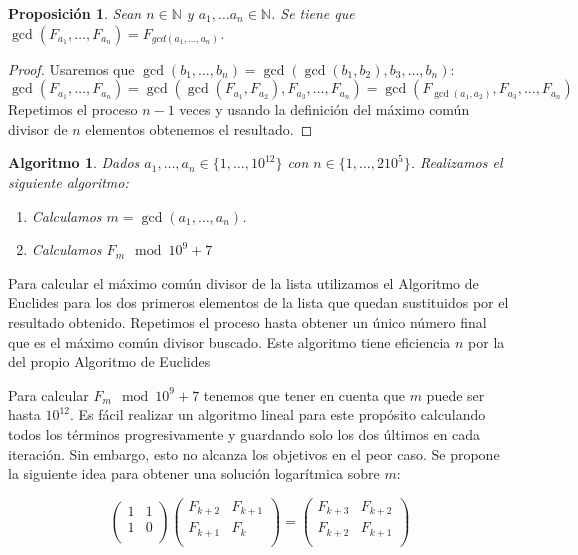 \documentclass{article}
\theoremstyle{theorem-style}  %
\newtheorem{proposition}{Proposición}
\newtheorem{algorithm}{Algoritmo}
\theoremstyle{definition}
\theoremstyle{example-style}
\begin{document}
    \begin{proposition}
        Sean $n \in \mathbb{N}$ y $a_1, \dots a_n \in \mathbb{N}$. Se tiene que 
        $\gcd(F_{a_1}, \dots, F_{a_n}) = F_{gcd(a_1, \dots, a_n)}$. 
    \end{proposition}
    \begin{proof}
        Usaremos que $\gcd(b_1, \dots, b_n) = \gcd( \gcd(b_1, b_2), b_3, \dots, b_n)$:
        $$ \gcd(F_{a_1}, \dots, F_{a_n}) = \gcd(\gcd(F_{a_1},F_{a_2}), F_{a_3}, \dots, F_{a_n}) = \gcd(F_{\gcd(a_1, a_2)}, F_{a_3}, \dots, F_{a_n}) $$
        Repetimos el proceso $n-1$ veces y usando la definición del máximo común divisor de $n$ elementos obtenemos el resultado.
    \end{proof}

    \begin{algorithm}
        Dados $a_1, \dots, a_n \in \{1, \dots, 10^{12}\}$ con $n \in \{1, \dots, 2 10^5\}$. Realizamos el siguiente algoritmo:
        \begin{enumerate}
            \item Calculamos $m = \gcd(a_1, \dots, a_n)$.
            \item Calculamos $F_m \mod 10^9+7$
        \end{enumerate}
    \end{algorithm}
    
    Para calcular el máximo común divisor de la lista utilizamos el Algoritmo de Euclides para los dos primeros elementos de la lista que quedan sustituidos por el resultado obtenido. Repetimos el proceso hasta obtener un único número final que es el máximo común divisor buscado. Este algoritmo tiene eficiencia $n$ por la del propio Algoritmo de Euclides 
    
    Para calcular $F_m \mod 10^9+7$ tenemos que tener en cuenta que $m$ puede ser hasta $10^{12}$. Es fácil realizar un algoritmo lineal para este propósito calculando todos los términos progresivamente y guardando solo los dos últimos en cada iteración. Sin embargo, esto no alcanza los objetivos en el peor caso. Se propone la siguiente idea para obtener una solución logarítmica sobre $m$:
    
    \begin{equation}
        \begin{pmatrix}
            1 & 1 \\
            1 & 0 \\
        \end{pmatrix}
        \begin{pmatrix}
            F_{k+2} & F_{k+1} \\
            F_{k+1} & F_{k} \\
        \end{pmatrix}
        =
        \begin{pmatrix}
            F_{k+3} & F_{k+2} \\
            F_{k+2} & F_{k+1} \\
        \end{pmatrix}        
    \end{equation}
    
\end{document}
